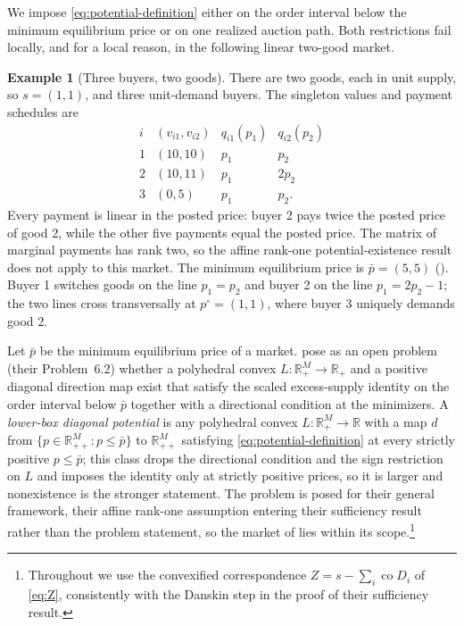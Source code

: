 \documentclass[11pt,a4paper,fleqn]{article}
\theoremstyle{plain}
\theoremstyle{definition}
\newtheorem{example}{Example}
\newcommand{\R}{\mathbb{R}}
\newcommand{\co}{\operatorname{co}}
\begin{document}
We impose \eqref{eq:potential-definition} either on the order interval below the minimum equilibrium price or on one realized auction path. Both restrictions fail locally, and for a local reason, in the following linear two-good market.

\begin{example}[Three buyers, two goods]\label{ex:two-good}
There are two goods, each in unit supply, so $s=(1,1)$, and three unit-demand buyers. The singleton values and payment schedules are
\begin{equation}\label{eq:path-market}
\begin{array}{c|c|cc}
 i &(v_{i1},v_{i2})&q_{i1}(p_1)&q_{i2}(p_2)\\ \hline
 1&(10,10)&p_1&p_2\\
 2&(10,11)&p_1&2p_2\\
 3&(0,5)&p_1&p_2.
\end{array}
\end{equation}
Every payment is linear in the posted price: buyer 2 pays twice the posted price of good 2, while the other five payments equal the posted price. The matrix of marginal payments has rank two, so the affine rank-one potential-existence result does not apply to this market. The minimum equilibrium price is $\bar p=(5,5)$ (). Buyer 1 switches goods on the line $p_1=p_2$ and buyer 2 on the line $p_1=2p_2-1$; the two lines cross transversally at $p^\circ=(1,1)$, where buyer 3 uniquely demands good 2.
\end{example}

Let $\bar p$ be the minimum equilibrium price of a market. \citet{okisato2026} pose as an open problem (their Problem~6.2) whether a polyhedral convex $L:\R_+^M\to\R_+$ and a positive diagonal direction map exist that satisfy the scaled excess-supply identity on the order interval below $\bar p$ together with a directional condition at the minimizers. A \emph{lower-box diagonal potential} is any polyhedral convex $L:\R_+^M\to\R$ with a map $d$ from $\{p\in\R_{++}^M:p\le\bar p\}$ to $\R_{++}^M$ satisfying \eqref{eq:potential-definition} at every strictly positive $p\le\bar p$; this class drops the directional condition and the sign restriction on $L$ and imposes the identity only at strictly positive prices, so it is larger and nonexistence is the stronger statement. The problem is posed for their general framework, their affine rank-one assumption entering their sufficiency result rather than the problem statement, so the market of  lies within its scope.\footnote{Throughout we use the convexified correspondence $Z=s-\sum_i\co D_i$ of \eqref{eq:Z}, consistently with the Danskin step in the proof of their sufficiency result.}
\end{document}
